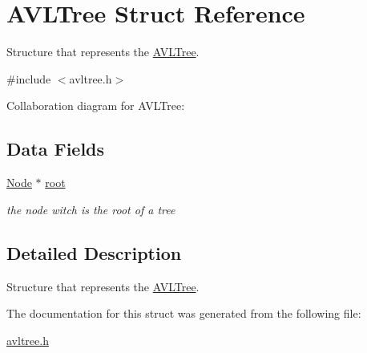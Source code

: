 \hypertarget{structAVLTree}{}\section{A\+V\+L\+Tree Struct Reference}
\label{structAVLTree}


Structure that represents the \hyperlink{structAVLTree}{A\+V\+L\+Tree}.  




{\ttfamily \#include $<$avltree.\+h$>$}



Collaboration diagram for A\+V\+L\+Tree\+:
\subsection*{Data Fields}
\begin{DoxyCompactItemize}
\item 
\hyperlink{structNode}{Node} $\ast$ \hyperlink{structAVLTree_a3db9914a012a92648fc774b1112c79f0}{root}\hypertarget{structAVLTree_a3db9914a012a92648fc774b1112c79f0}{}\label{structAVLTree_a3db9914a012a92648fc774b1112c79f0}

\begin{DoxyCompactList}\small\item\em the node witch is the root of a tree \end{DoxyCompactList}\end{DoxyCompactItemize}


\subsection{Detailed Description}
Structure that represents the \hyperlink{structAVLTree}{A\+V\+L\+Tree}. 

The documentation for this struct was generated from the following file\+:\begin{DoxyCompactItemize}
\item 
\hyperlink{avltree_8h}{avltree.\+h}\end{DoxyCompactItemize}
